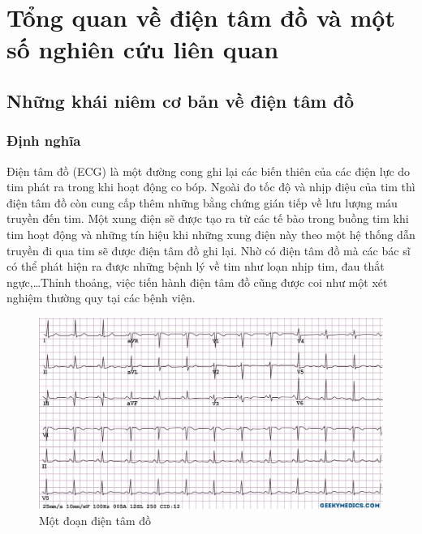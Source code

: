 \chapter{Tổng quan về điện tâm đồ và một số nghiên cứu liên quan}
\thispagestyle{fancy}

\section{Những khái niêm cơ bản về điện tâm đồ}
\subsection{Định nghĩa}
Điện tâm đồ (ECG) là một đường cong ghi lại các biến thiên của các điện lực do tim phát ra trong khi hoạt động co bóp. Ngoài đo tốc độ và nhịp điệu của tim thì điện tâm đồ còn cung cấp thêm những bằng chứng gián tiếp về lưu lượng máu truyền đến tim. Một xung điện sẽ được tạo ra từ các tế bào trong buồng tim khi tim hoạt động và những tín hiệu khi những xung điện này theo một hệ thống dẫn truyền đi qua tim sẽ được điện tâm đồ ghi lại. Nhờ có điện tâm đồ mà các bác sĩ có thể phát hiện ra được những bệnh lý về tim như loạn nhịp tim, đau thắt ngực,…Thỉnh thoảng, việc tiến hành điện tâm đồ cũng được coi như một xét nghiệm thường quy tại các bệnh viện.
\begin{center}
    \begin{figure}[htp]
    \begin{center}
     \includegraphics[scale=.35]{image/chapter1/Normal-ECG-SCALED-DOWN-WATERMARK.jpg}
    \end{center}
    \caption{Một đoạn điện tâm đồ }
    \end{figure}
\end{center}

